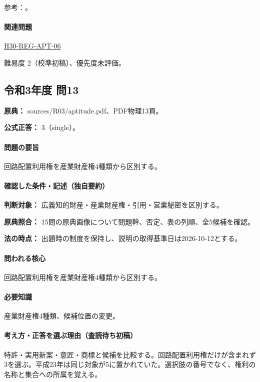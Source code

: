 \par 参考：\cite{ip_industrial_four,ip_broad_scope}。

\paragraph{関連問題} \hyperref[q:h30-reg-apt-06]{H30-REG-APT-06}

\par 難易度 2（校準初稿）、優先度未評価。

\subsection{令和3年度 問13}
\label{q:r03-reg-apt-13}

\noindent\textbf{原典：} sources/R03/aptitude.pdf、PDF物理13頁。

\textbf{公式正答：} 3（single）。

\paragraph{問題の要旨} 回路配置利用権を産業財産権4種類から区別する。

\paragraph{確認した条件・記述（独自要約）}\mbox{}\par

\noindent\textbf{判断対象：} 広義知的財産・産業財産権・引用・営業秘密を区別する。\par

\noindent\textbf{原典照合：} 15問の原典画像について問題幹、否定、表の列順、全5候補を確認。\par

\noindent\textbf{法の時点：} 出題時の制度を保持し、説明の取得基準日は2026-10-12とする。\par

\paragraph{問われる核心} 回路配置利用権を産業財産権4種類から区別する。

\paragraph{必要知識} 産業財産権4種類、候補位置の変更。

\paragraph{考え方・正答を選ぶ理由（査読待ち初稿）} 特許・実用新案・意匠・商標と候補を比較する。回路配置利用権だけが含まれず3を選ぶ。平成23年は同じ対象が5に置かれていた。選択肢の番号でなく、権利の名称と集合への所属を覚える。

